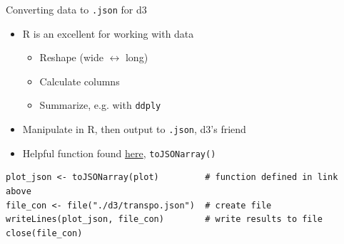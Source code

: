 \documentclass[sans,aspectratio=169,presentation,bigger,fleqn]{beamer}
\begin{document}
\begin{frame}[fragile,label=sec-30]{Converting data to \texttt{.json} for d3}
 \begin{itemize}
\item R is an excellent for working with data
\begin{itemize}
\item Reshape (wide \(\leftrightarrow\) long)
\item Calculate columns
\item Summarize, e.g. with \texttt{ddply}
\end{itemize}
\item Manipulate in R, then output to \texttt{.json}, d3's friend
\item Helpful function found \href{http://theweiluo.wordpress.com/2011/09/30/r-to-json-for-d3-js-and-protovis/}{here}, \texttt{toJSONarray()}
\end{itemize}

\scriptsize
\begin{verbatim}
plot_json <- toJSONarray(plot)         # function defined in link above
file_con <- file("./d3/transpo.json")  # create file
writeLines(plot_json, file_con)        # write results to file
close(file_con)
\end{verbatim}
\normalsize
\end{frame}
\end{document}
